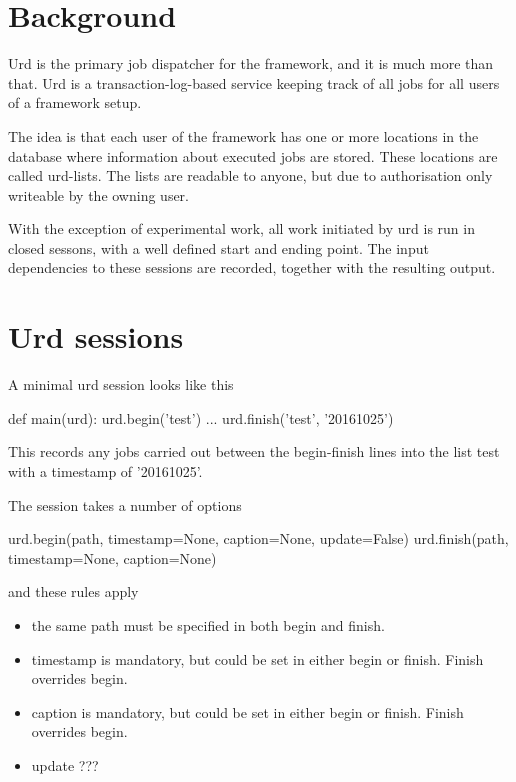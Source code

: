 \section{Background}

Urd is the primary job dispatcher for the framework, and it is much
more than that.  Urd is a transaction-log-based service keeping track
of all jobs for all users of a framework setup.

The idea is that each user of the framework has one or more locations
in the database where information about executed jobs are stored.
These locations are called urd-lists.  The lists are readable to
anyone, but due to authorisation only writeable by the owning user.

With the exception of experimental work, all work initiated by urd is
run in closed sessons, with a well defined start and ending point.
The input dependencies to these sessions are recorded, together with
the resulting output.



\section{Urd sessions}

A minimal urd session looks like this

\begin{python}
def main(urd):
  urd.begin('test')
  ...
  urd.finish('test', '20161025')
\end{python}
This records any jobs carried out between the begin-finish lines into
the list test with a timestamp of '20161025'.

The session takes a number of options

\begin{python}
  urd.begin(path, timestamp=None, caption=None, update=False)
  urd.finish(path, timestamp=None, caption=None)
\end{python}
and these rules apply
\begin{itemize}
  \item the same path must be specified in both begin and finish.
  \item timestamp is mandatory, but could be set in either begin or
    finish.  Finish overrides begin.
  \item caption is mandatory, but could be set in either begin or
    finish.  Finish overrides begin.
  \item update ???
\end{itemize}

